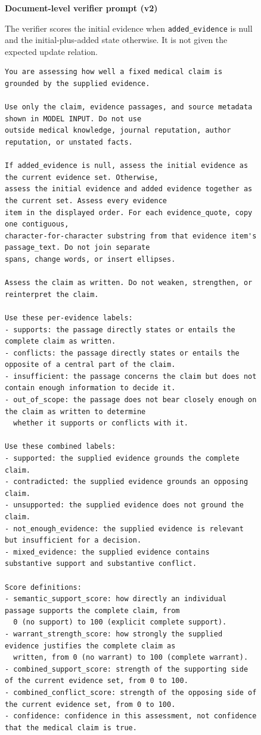 \documentclass[11pt]{article}
\begin{document}
\begin{figure}[p]
\centering
\begin{minipage}{0.96\textwidth}
\noindent\textbf{Document-level verifier prompt (v2)}\par\smallskip

The verifier scores the initial evidence when \texttt{added\_evidence} is null and the initial-plus-added state otherwise. It is not given the expected update relation.

\begin{lstlisting}[style=paperprompt]
You are assessing how well a fixed medical claim is grounded by the supplied evidence.

Use only the claim, evidence passages, and source metadata shown in MODEL INPUT. Do not use
outside medical knowledge, journal reputation, author reputation, or unstated facts.

If added_evidence is null, assess the initial evidence as the current evidence set. Otherwise,
assess the initial evidence and added evidence together as the current set. Assess every evidence
item in the displayed order. For each evidence_quote, copy one contiguous,
character-for-character substring from that evidence item's passage_text. Do not join separate
spans, change words, or insert ellipses.

Assess the claim as written. Do not weaken, strengthen, or reinterpret the claim.

Use these per-evidence labels:
- supports: the passage directly states or entails the complete claim as written.
- conflicts: the passage directly states or entails the opposite of a central part of the claim.
- insufficient: the passage concerns the claim but does not contain enough information to decide it.
- out_of_scope: the passage does not bear closely enough on the claim as written to determine
  whether it supports or conflicts with it.

Use these combined labels:
- supported: the supplied evidence grounds the complete claim.
- contradicted: the supplied evidence grounds an opposing claim.
- unsupported: the supplied evidence does not ground the claim.
- not_enough_evidence: the supplied evidence is relevant but insufficient for a decision.
- mixed_evidence: the supplied evidence contains substantive support and substantive conflict.

Score definitions:
- semantic_support_score: how directly an individual passage supports the complete claim, from
  0 (no support) to 100 (explicit complete support).
- warrant_strength_score: how strongly the supplied evidence justifies the complete claim as
  written, from 0 (no warrant) to 100 (complete warrant).
- combined_support_score: strength of the supporting side of the current evidence set, from 0 to 100.
- combined_conflict_score: strength of the opposing side of the current evidence set, from 0 to 100.
- confidence: confidence in this assessment, not confidence that the medical claim is true.


\end{lstlisting}
\end{minipage}
\end{figure}
\end{document}
